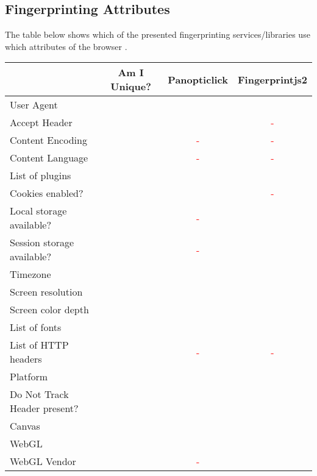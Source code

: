 \documentclass[
    fontsize=12pt,
    headings=small,
    parskip=half,
    bibliography=totoc,
    numbers=noenddot,
    open=any
]{scrreprt}
\newcommand{\cmark}{\textcolor{green}{\ding{51}}}
\newcommand{\xmark}{\textcolor{red}{-}}
\begin{document}
\begin{appendices}

\chapter{Fingerprinting Attributes}
\label{app:table}

The table below shows which of the presented fingerprinting services/libraries use which attributes of the
browser \cite{am_i_unique,panopticlick,fingerprintjs2}.

\begin{tabular}{ l c c c }
    \arrayrulecolor{hlinegray}

    & Am I Unique? & Panopticlick & Fingerprintjs2 \\
    \hline
    User Agent & \cmark & \cmark & \cmark \\
    \hline
    Accept Header & \cmark & \cmark & \xmark \\
    \hline
    Content Encoding & \cmark & \xmark & \xmark \\
    \hline
    Content Language & \cmark & \xmark & \xmark \\
    \hline
    List of plugins & \cmark & \cmark & \cmark \\
    \hline
    Cookies enabled? & \cmark & \cmark & \xmark \\
    \hline
    Local storage available? & \cmark & \xmark & \cmark \\
    \hline
    Session storage available? & \cmark & \xmark & \cmark \\
    \hline
    Timezone & \cmark & \cmark & \cmark \\
    \hline
    Screen resolution & \cmark & \cmark & \cmark \\
    \hline
    Screen color depth & \cmark & \cmark & \cmark \\
    \hline
    List of fonts & \cmark & \cmark & \cmark \\
    \hline
    List of HTTP headers & \cmark & \xmark & \xmark \\
    \hline
    Platform & \cmark & \cmark & \cmark \\
    \hline
    Do Not Track Header present? & \cmark & \cmark & \cmark \\
    \hline
    Canvas & \cmark & \cmark & \cmark \\
    \hline
    WebGL & \cmark & \cmark & \cmark \\
    \hline
    WebGL Vendor & \cmark & \xmark & \cmark \\

\end{tabular}
\end{appendices}
\end{document}
